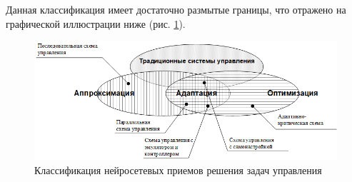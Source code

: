 Данная классификация имеет достаточно размытые границы, что отражено на графической иллюстрации ниже (рис. \ref{fig:neuro_control_classification}).

\begin{figure}[H]
    \centering
    \includegraphics{images/chapter1/Классификация нейросетевых приемов решения задач управления.png}
    \caption{Классификация нейросетевых приемов решения задач управления}
    \label{fig:neuro_control_classification}
\end{figure}
